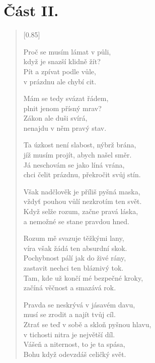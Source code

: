 \documentclass[12pt, a4paper]{article}
\begin{document}
\section*{Část II.}

\begin{verse}[0.85\textwidth]

Proč se musím lámat v půli, \\
když je snazší klidně žít? \\
Pít a zpívat podle vůle, \\
v prázdnu ale chybí cit.

\vspace{1em}

Mám se tedy svázat řádem,\\
plnit jenom přísný mrav? \\
Zákon ale duši svírá, \\
nenajdu v něm pravý stav.

\vspace{1em}

Ta úzkost není slabost, nýbrž brána, \\
jíž musím projít, abych našel směr. \\
Já neschovám se jako líná vrána, \\
chci čelit prázdnu, překročit svůj stín.

\vspace{1em}

Však nadčlověk je příliš pyšná maska, \\
vždyť pouhou vůlí nezkrotím ten svět. \\
Když selže rozum, začne pravá láska, \\
a nemožné se stane pravdou hned.

\vspace{1em}

Rozum mě svazuje těžkými lany, \\
víra však žádá ten absurdní skok. \\
Pochybnost pálí jak do živé rány, \\
zastavit nechci ten bláznivý tok. \\
Tam, kde už končí mé bezpečné kroky, \\
začíná věčnost a smazává rok.

\vspace{1em}


Pravda se neskrývá v jásavém davu, \\
musí se zrodit a najít tvůj cíl. \\
Ztrať se teď v sobě a skloň pyšnou hlavu, \\
v tichosti nitra je největší díl. \\
Vášeň a niternost, to je ta spása, \\
Bohu když odevzdáš celičký svět.


\end{verse}
\end{document}
